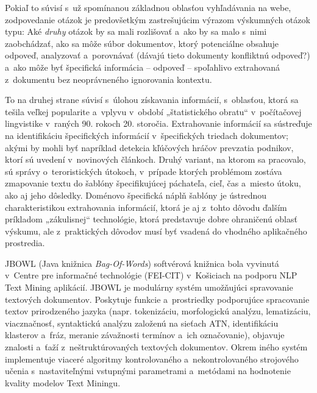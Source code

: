 \begin{multicols}{2}
Pokiaľ to súvisí
s~už spomínanou základnou oblasťou vyhľadávania na webe,
zodpovedanie otázok je predovšetkým zastrešujúcim výrazom
výskumných otázok typu: Aké \emph{druhy} otázok by sa mali
rozlišovať a~ako by sa malo s~nimi zaobchádzať, ako sa môže súbor
dokumentov, ktorý potenciálne obsahuje odpoveď, analyzovať
a~porovnávať (dávajú tieto dokumenty konfliktnú odpoveď?) a~ako
môže byť špecifická informácia – odpoveď – spoľahlivo
extrahovaná z~dokumentu bez neoprávneného ignorovania kontextu. 

To na druhej strane súvisí s~úlohou získavania informácií, s~oblasťou, ktorá sa tešila veľkej popularite a~vplyvu v~období „štatistického obratu“ v~počítačovej lingvistike v~raných 90. rokoch 20. storočia. Extrahovanie informácií sa sústreďuje na identifikáciu špecifických informácií v~špecifických triedach dokumentov; akými by mohli byť napríklad detekcia kľúčových hráčov prevzatia podnikov, ktorí sú uvedení v~novinových článkoch. Druhý variant, na ktorom sa pracovalo, sú správy o~teroristických útokoch, v~prípade ktorých problémom zostáva zmapovanie textu do šablóny špecifikujúcej páchateľa, cieľ, čas a~miesto útoku, ako aj jeho dôsledky. Doménovo špecifická náplň šablóny je ústrednou charakteristikou extrahovania informácií, ktorá je aj z~tohto dôvodu ďalším príkladom „zákulisnej“ technológie, ktorá predstavuje dobre ohraničenú oblasť výskumu, ale z~praktických dôvodov musí byť vsadená do vhodného aplikačného prostredia. 


JBOWL (Java knižnica \emph{Bag-Of-Words}) softvérová knižnica bola vyvinutá v~Centre pre informačné technológie (FEI-CIT) v~Košiciach na podporu NLP Text Mining aplikácií. JBOWL je modulárny systém umožňujúci spravovanie textových dokumentov. Poskytuje funkcie a~prostriedky podporujúce spracovanie textov prirodzeného jazyka (napr. tokenizáciu, morfologickú analýzu, lematizáciu, viacznačnosť, syntaktickú analýzu založenú na sieťach ATN, identifikáciu klasterov a~fráz, meranie závažnosti termínov a~ich označovanie), objavuje znalosti a~ťaží z~neštruktúrovaných textových dokumentov. Okrem iného systém implementuje viaceré algoritmy kontrolovaného a~nekontrolovaného strojového učenia s~nastaviteľnými vstupnými parametrami a~metódami na hodnotenie kvality modelov Text Miningu.


\end{multicols}
